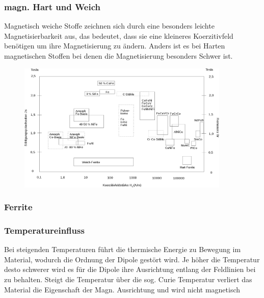         \subsubsection*{magn. Hart und Weich}
            Magnetisch weiche Stoffe zeichnen sich durch eine besonders leichte Magnetisierbarkeit aus, das bedeutet,
            dass sie eine kleineres Koerzitivfeld benötigen um ihre Magnetisierung zu ändern. Anders ist es bei Harten
            magnetischen Stoffen bei denen die Magnetisierung besonders Schwer ist.
            \begin{figure}[H]
                \centering
                \includegraphics[width=0.9\textwidth]{Images/übersicht_Koerzitivfeldstärke.png}
            \end{figure}
        \subsubsection*{Ferrite}

        \subsubsection*{Temperatureinfluss}
            Bei steigenden Temperaturen führt die thermische Energie zu Bewegung im Material, wodurch die Ordnung der
            Dipole gestört wird. Je höher die Temperatur desto schwerer wird es für die Dipole ihre Ausrichtung entlang
            der Feldlinien bei zu behalten. Steigt die Temperatur über die sog. Curie Temperatur verliert das Material
            die Eigenschaft der Magn. Ausrichtung und wird nicht magnetisch
